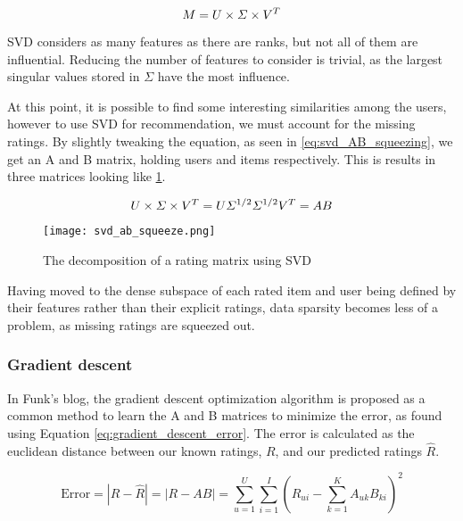 \begin{equation} \label{eq:svd_decomp}
\centering
M = U\times \Sigma \times V^T
\end{equation}

SVD considers as many features as there are ranks, but not all of them are influential. Reducing the number of features to consider is trivial, as the largest singular values stored in $\Sigma$ have the most influence.

At this point, it is possible to find some interesting similarities among the users, however to use SVD for recommendation, we must account for the missing ratings. By slightly tweaking the equation, as seen in \ref{eq:svd_AB_squeezing}, we get an A and B matrix, holding users and items respectively. This is results in three matrices looking like \ref{fig:svd_squeeze}.

\begin{equation}\label{eq:svd_AB_squeezing}
	\centering
	U\times \Sigma \times V^T = U\Sigma^{1/2} \Sigma^{1/2}V^T = AB
\end{equation}

\begin{figure} [H] \label{fig:svd_squeeze}
	\centering
	\texttt{[image: svd\_ab\_squeeze.png]}
	\caption{The decomposition of a rating matrix using SVD}
\end{figure}

Having moved to the dense subspace of each rated item and user being defined by their features rather than their explicit ratings, data sparsity becomes less of a problem, as missing ratings are squeezed out.

\subsubsection{Gradient descent}
In Funk's blog, the gradient descent optimization algorithm is proposed as a common method to learn the A and B matrices to minimize the error, as found using Equation \ref{eq:gradient_descent_error}. The error is calculated as the euclidean distance between our known ratings, $R$, and our predicted ratings $\hat{R}$.

\begin{equation}\label{eq:gradient_descent_error}
\text{Error} = |R-\hat{R}| = |R - AB| = \sum_{u=1}^{U}\sum_{i=1}^{I}\left (R_{ui}- \sum_{k=1}^{K} A_{uk}B_{ki} \right )^2
\end{equation}

